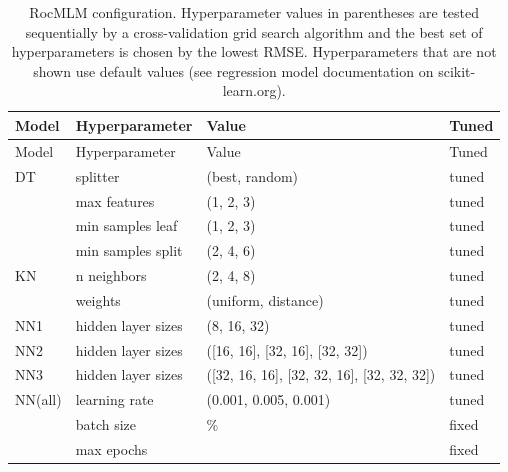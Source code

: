 \documentclass[draft,linenumbers]{agujournal2018}
\begin{document}
\begin{longtable}[]{@{}
  >{\raggedright\arraybackslash}p{}
  >{\raggedright\arraybackslash}p{}
  >{\raggedright\arraybackslash}p{}
  >{\raggedright\arraybackslash}p{}@{}}
\caption{\label{tab:rocmlm-config} RocMLM configuration. Hyperparameter values in parentheses are tested sequentially by a cross-validation grid search algorithm and the best set of hyperparameters is chosen by the lowest RMSE. Hyperparameters that are not shown use default values (see regression model documentation on scikit-learn.org).}\tabularnewline
\toprule\noalign{}
\begin{minipage}[b]{\linewidth}\raggedright
Model
\end{minipage} & \begin{minipage}[b]{\linewidth}\raggedright
Hyperparameter
\end{minipage} & \begin{minipage}[b]{\linewidth}\raggedright
Value
\end{minipage} & \begin{minipage}[b]{\linewidth}\raggedright
Tuned
\end{minipage} \\
\midrule\noalign{}
\endfirsthead
\toprule\noalign{}
\begin{minipage}[b]{\linewidth}\raggedright
Model
\end{minipage} & \begin{minipage}[b]{\linewidth}\raggedright
Hyperparameter
\end{minipage} & \begin{minipage}[b]{\linewidth}\raggedright
Value
\end{minipage} & \begin{minipage}[b]{\linewidth}\raggedright
Tuned
\end{minipage} \\
\midrule\noalign{}
\endhead
\bottomrule\noalign{}
\endlastfoot
DT & splitter & (best, random) & tuned \\
& max features & (1, 2, 3) & tuned \\
& min samples leaf & (1, 2, 3) & tuned \\
& min samples split & (2, 4, 6) & tuned \\
KN & n neighbors & (2, 4, 8) & tuned \\
& weights & (uniform, distance) & tuned \\
NN1 & hidden layer sizes & (8, 16, 32) & tuned \\
NN2 & hidden layer sizes & ({[}16, 16{]}, {[}32, 16{]}, {[}32, 32{]}) & tuned \\
NN3 & hidden layer sizes & ({[}32, 16, 16{]}, {[}32, 32, 16{]}, {[}32, 32, 32{]}) & tuned \\
NN(all) & learning rate & (0.001, 0.005, 0.001) & tuned \\
& batch size & 20\% & fixed \\
& max epochs & 100 & fixed \\
\end{longtable}
\end{document}
